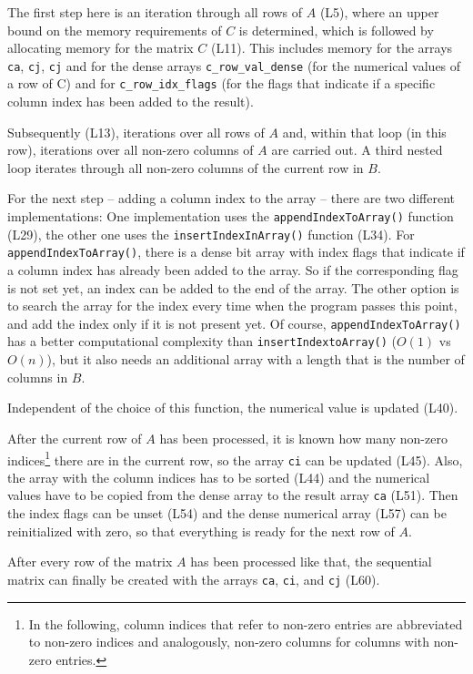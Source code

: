 The first step here is an iteration through all rows of $A$ (L5), where an upper bound on the memory requirements of $C$ is determined, which is followed by allocating memory for the matrix $C$ (L11). This includes memory for the arrays \texttt{ca}, \texttt{cj}, \texttt{cj} and for the dense arrays \texttt{c\_row\_val\_dense} (for the numerical values of a row of C) and for \texttt{c\_row\_idx\_flags} (for the flags that indicate if a specific column index has been added to the result).

Subsequently (L13), iterations over all rows of $A$ and, within that loop (in this row), iterations over all non-zero columns of $A$ are carried out. A third nested loop iterates through all non-zero columns of the current row in $B$. 

For the next step -- adding a column index to the array -- there are two different implementations: One implementation uses the \texttt{appendIndexToArray()} function (L29), the other one uses the \texttt{insertIndexInArray()} function (L34). For \texttt{appendIndexToArray()}, there is a dense bit array with index flags that indicate if a column index has already been added to the array. So if the corresponding flag is not set yet, an index can be added to the end of the array. The other option is to search the array for the index every time when the program passes this point, and add the index only if it is not present yet. Of course, \texttt{appendIndexToArray()} has a better computational complexity than \texttt{insertIndextoArray()} ($O(1)$ vs $O(n)$), but it also needs an additional array with a length that is the number of columns in $B$.

Independent of the choice of this function, the numerical value is updated (L40).

After the current row of $A$ has been processed, it is known how many non-zero indices\footnote{In the following, column indices that refer to non-zero entries are abbreviated to non-zero indices and analogously, non-zero columns for columns with non-zero entries.} there are in the current row, so the array \texttt{ci} can be updated (L45). Also, the array with the column indices has to be sorted (L44) and the numerical values have to be copied from the dense array to the result array \texttt{ca} (L51). Then the index flags can be unset (L54) and the dense numerical array (L57) can be reinitialized with zero, so that everything is ready for the next row of $A$.


After every row of the matrix $A$ has been processed like that, the sequential matrix can finally be created with the arrays \texttt{ca}, \texttt{ci}, and \texttt{cj} (L60).




